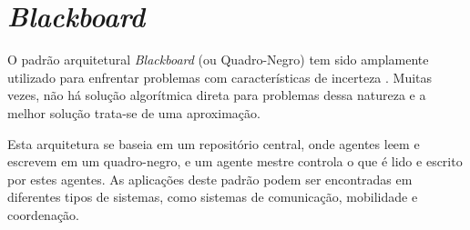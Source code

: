 \let\cleardoublepage\clearpage

\chapter{\textit{Blackboard}}\label{sec:blackboard}
\let\cleardoublepage\clearpage

O padrão arquitetural \textit{Blackboard} (ou Quadro-Negro) tem sido amplamente utilizado para enfrentar problemas com características de incerteza \cite{dong2005event}. Muitas vezes, não há solução algorítmica direta para problemas dessa natureza e a melhor solução trata-se de uma aproximação. 

Esta arquitetura se baseia em um repositório central, onde agentes leem e escrevem em um quadro-negro, e um agente mestre controla o que é lido e escrito por estes agentes.
As aplicações deste padrão podem ser encontradas em diferentes tipos de sistemas, como sistemas de comunicação, mobilidade e coordenação.  



